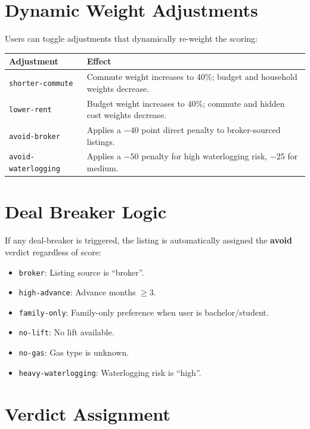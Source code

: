 \documentclass[12pt, a4paper, oneside]{report}
\begin{document}
\section{Dynamic Weight Adjustments}

Users can toggle adjustments that dynamically re-weight the scoring:

\begin{longtable}{p{4cm} p{9cm}}
\toprule
\textbf{Adjustment} & \textbf{Effect} \\
\midrule
\endhead
\texttt{shorter-commute} & Commute weight increases to 40\%; budget and household weights decrease. \\
\midrule
\texttt{lower-rent} & Budget weight increases to 40\%; commute and hidden cost weights decrease. \\
\midrule
\texttt{avoid-broker} & Applies a $-40$ point direct penalty to broker-sourced listings. \\
\midrule
\texttt{avoid-waterlogging} & Applies a $-50$ penalty for high waterlogging risk, $-25$ for medium. \\
\bottomrule
\end{longtable}

\section{Deal Breaker Logic}

If any deal-breaker is triggered, the listing is automatically assigned the \textbf{avoid} verdict regardless of score:

\begin{itemize}[leftmargin=2em]
  \item \texttt{broker}: Listing source is ``broker''.
  \item \texttt{high-advance}: Advance months $\geq 3$.
  \item \texttt{family-only}: Family-only preference when user is bachelor/student.
  \item \texttt{no-lift}: No lift available.
  \item \texttt{no-gas}: Gas type is unknown.
  \item \texttt{heavy-waterlogging}: Waterlogging risk is ``high''.
\end{itemize}

\section{Verdict Assignment}
\end{document}
